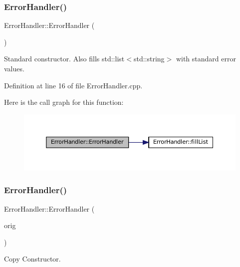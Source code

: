\subsubsection{\texorpdfstring{ErrorHandler()}{ErrorHandler()}\hspace{0.1cm}{\footnotesize\ttfamily [1/2]}}
{\footnotesize\ttfamily Error\+Handler\+::\+Error\+Handler (\begin{DoxyParamCaption}{ }\end{DoxyParamCaption})}



Standard constructor. Also fills std\+::list$<$std\+::string$>$ with standard error values. 



Definition at line 16 of file Error\+Handler.\+cpp.

Here is the call graph for this function\+:
\nopagebreak
\begin{figure}[H]
\begin{center}
\leavevmode
\includegraphics[width=350pt]{classErrorHandler_a7e5f379bd231442b898cef94556b2107_cgraph}
\end{center}
\end{figure}
\mbox{\label{classErrorHandler_add20b373ee276ee2ef040f6dd913a86b}} 
\subsubsection{\texorpdfstring{ErrorHandler()}{ErrorHandler()}\hspace{0.1cm}{\footnotesize\ttfamily [2/2]}}
{\footnotesize\ttfamily Error\+Handler\+::\+Error\+Handler (\begin{DoxyParamCaption}\item[{const \mbox{\hyperlink{classErrorHandler}{Error\+Handler}} \&}]{orig }\end{DoxyParamCaption})}



Copy Constructor. 


